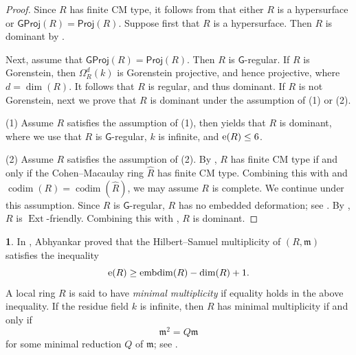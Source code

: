 \documentclass{amsart}
\DeclareMathOperator{\embdim}{embdim}
\newcommand{\0}{{\bf{0}}}
\newcommand{\m}{\mathfrak{m}}
\DeclareMathOperator{\Ext}{Ext}
\DeclareMathOperator{\codim}{codim}
\newcommand{\Proj}{\mathsf{Proj}}
\newcommand{\GProj}{\mathsf{GProj}}
\theoremstyle{definition}
\newtheorem{chunk}[theorem]{}
\begin{document}
\begin{proof}
    Since $R$ has finite CM type,  it follows from \cite[Theorem 1.3]{DKLO} that either $R$ is a hypersurface or $\GProj(R)=\Proj(R)$.
    Suppose first that $R$ is a hypersurface. Then $R$ is dominant by .

    Next, assume that $\GProj(R)=\Proj(R)$. Then $R$ is $\mathsf G$-regular. If $R$ is Gorenstein, then $\Omega^d_R(k)$ is Gorenstein projective, and hence projective, where $d=\dim(R)$. It follows that $R$ is regular, and thus dominant. If $R$ is not Gorenstein,  next we prove that $R$ is dominant under the assumption of (1) or (2).

    
 (1) Assume $R$ satisfies the assumption of (1), then \cite[Proposition 6.7(4)]{KT2026} yields that $R$ is dominant, where we use that $R$ is $\mathsf G$-regular, $k$ is infinite, and ${\rm e}(R)\leq 6$. 
 
 (2) Assume $R$ satisfies the assumption of (2). By \cite[Theorem 1.2]{DKLO}, $R$ has finite CM type if and only if the Cohen--Macaulay ring $\widehat{R}$ has finite CM type. 
 Combining this with   and $\codim(R)=\codim(\widehat{R})$, we may assume $R$ is complete. We continue under this assumption. 
Since $R$ is $\mathsf G$-regular, $R$ has no embedded deformation; see \cite[Remark 5.5(5)]{KT2026}. By \cite[Theorem 3.8]{LM2020}, $R$ is $\Ext$-friendly.  Combining this with \cite[Proposition 6.6(1)]{Takahashi:2023}, $R$ is dominant.  
\end{proof}
\begin{chunk}\label{mini-mul}
In \cite{Abhyankar}, Abhyankar proved that the Hilbert--Samuel  multiplicity of $(R,\m)$
satisfies the inequality
\[
{\rm e}(R)\geq \embdim(R)-\dim(R)+1.
\]
A local ring $R$ is said to have \emph{minimal multiplicity} if equality holds
in the above inequality.
If the residue field $k$ is infinite, then $R$ has minimal multiplicity if and
only if
\[
\m^2=Q\m
\]
for some minimal reduction $Q$ of $\m$; see 
\cite[Exercise 4.6.14]{BH}.
\end{chunk} 
\end{document}
